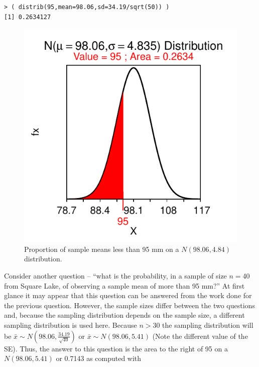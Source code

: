 \documentclass[10pt,openany]{book}\usepackage[]{graphicx}\usepackage[]{color}
\makeatletter
\newenvironment{kframe}{%
 \def\at@end@of@kframe{}%
 \ifinner\ifhmode%
  \def\at@end@of@kframe{\end{minipage}}%
  \begin{minipage}{\columnwidth}%
 \fi\fi%
 \def\FrameCommand##1{\hskip\@totalleftmargin \hskip-\fboxsep
 \colorbox{shadecolor}{##1}\hskip-\fboxsep
     \hskip-\linewidth \hskip-\@totalleftmargin \hskip\columnwidth}%
 \MakeFramed {\advance\hsize-\width
   \@totalleftmargin\z@ \linewidth\hsize
   \@setminipage}}%
 {\par\unskip\endMakeFramed%
 \at@end@of@kframe}
\newenvironment{knitrout}{}{} %
\makeatother
\begin{document}
\begin{knitrout}
\color{fgcolor}\begin{kframe}
\begin{verbatim}
> ( distrib(95,mean=98.06,sd=34.19/sqrt(50)) )
[1] 0.2634127
\end{verbatim}
\end{kframe}\begin{figure}[hbtp]

{\centering \includegraphics[width=.4\linewidth]{Figs/NormTL95-1} 

}

\caption[Proportion of sample means less than 95 mm on a $N(98.06,4.84)$ distribution]{Proportion of sample means less than 95 mm on a $N(98.06,4.84)$ distribution.}\label{fig:NormTL95}
\end{figure}


\end{knitrout}


Consider another question -- ``what is the probability, in a sample of size $n=$40 from Square Lake, of observing a sample mean of more than 95 mm?''  At first glance it may appear that this question can be answered from the work done for the previous question.  However, the sample sizes differ between the two questions and, because the sampling distribution depends on the sample size, a different sampling distribution is used here.  Because $n>30$ the sampling distribution will be $\bar{x}\sim N(98.06,\frac{34.19}{\sqrt{40}})$ or $\bar{x}\sim N(98.06,5.41)$ (Note the different value of the SE).  Thus, the answer to this question is the area to the right of 95 on a $N(98.06,5.41)$ or 0.7143  as computed with
\end{document}
